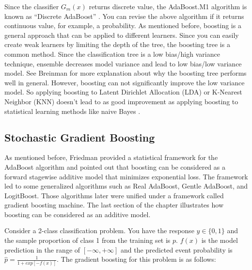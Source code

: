 \documentclass[12pt,]{krantz}
\begin{document}
Since the classifier \(G_m(x)\) returns discrete value, the AdaBoost.M1 algorithm is known as ``Discrete AdaBoost'' \citep{Friedman2000}. You can revise the above algorithm if it returns continuous value, for example, a probability\citep{Friedman2000}. As mentioned before, boosting is a general approach that can be applied to different learners. Since you can easily create weak learners by limiting the depth of the tree, the boosting tree is a common method. Since the classification tree is a low bias/high variance technique, ensemble decreases model variance and lead to low bias/low variance model. See Breinman\citep{Breiman1998} for more explanation about why the boosting tree performs well in general. However, boosting can not significantly improve the low variance model. So applying boosting to Latent Dirichlet Allocation (LDA) or K-Nearest Neighbor (KNN) doesn't lead to as good improvement as applying boosting to statistical learning methods like naive Bayes \citep{Bauer1999}.

\hypertarget{stochastic-gradient-boosting}{%
\subsection{Stochastic Gradient Boosting}\label{stochastic-gradient-boosting}}

As mentioned before, Friedman \citep{Friedman2000} provided a statistical framework for the AdaBoost algorithm and pointed out that boosting can be considered as a forward stagewise additive model that minimizes exponential loss. The framework led to some generalized algorithms such as Real AdaBoost, Gentle AdaBoost, and LogitBoost. Those algorithms later were unified under a framework called gradient boosting machine. The last section of the chapter illustrates how boosting can be considered as an additive model.

Consider a 2-class classification problem. You have the response \(y \in \{0, 1\}\) and the sample proportion of class 1 from the training set is \(p\). \(f(x)\) is the model prediction in the range of \([-\infty, +\infty]\) and the predicted event probability is \(\hat{p}=\frac{1}{1+exp[-f(x)]}\). The gradient boosting for this problem is as follows:
\end{document}
